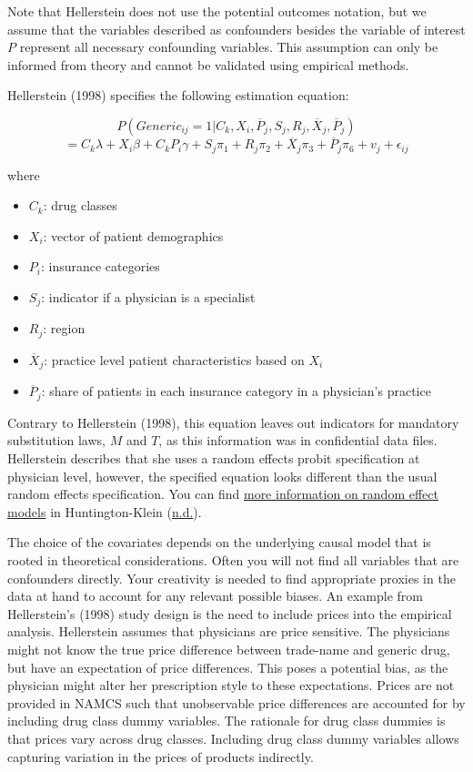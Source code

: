 \documentclass[
]{book}
\providecommand{\tightlist}{%
  \setlength{\itemsep}{0pt}\setlength{\parskip}{0pt}}
\begin{document}
Note that Hellerstein does not use the potential outcomes notation, but
we assume that the variables described as confounders besides the
variable of interest \(P\) represent all necessary confounding
variables. This assumption can only be informed from theory and cannot
be validated using empirical methods.

Hellerstein (1998) specifies the following estimation equation:

\[P(Generic_{ij}=1|C_k,X_i,\overline{P}_j,S_j, R_j,\overline{X}_j,\overline{P}_j)\]
\[= C_k\lambda+X_i\beta+C_kP_i\gamma+S_j\pi_1+R_j\pi_2+\overline{X}_j\pi_3+\overline{P}_j\pi_6+v_j+\epsilon_{ij}\]

where

\begin{itemize}
\tightlist
\item
  \(C_k\): drug classes
\item
  \(X_i\): vector of patient demographics
\item
  \(P_i\): insurance categories
\item
  \(S_j\): indicator if a physician is a specialist
\item
  \(R_j\): region
\item
  \(\overline{X}_j\): practice level patient characteristics based on
  \(X_i\)
\item
  \(\overline{P}_j\): share of patients in each insurance category in a
  physician's practice
\end{itemize}

Contrary to Hellerstein (1998), this equation leaves out indicators for
mandatory substitution laws, \(M\) and \(T\), as this information was in
confidential data files. Hellerstein describes that she uses a random
effects probit specification at physician level, however, the specified
equation looks different than the usual random effects specification.
You can find
\href{https://theeffectbook.net/ch-FixedEffects.html\#random-effects}{more
information on random effect models} in Huntington-Klein
(\protect\hyperlink{ref-huntington-klein_chapter_nodate}{n.d.}).

The choice of the covariates depends on the underlying causal model that
is rooted in theoretical considerations. Often you will not find all
variables that are confounders directly. Your creativity is needed to
find appropriate proxies in the data at hand to account for any relevant
possible biases. An example from Hellerstein's (1998) study design is
the need to include prices into the empirical analysis. Hellerstein
assumes that physicians are price sensitive. The physicians might not
know the true price difference between trade-name and generic drug, but
have an expectation of price differences. This poses a potential bias,
as the physician might alter her prescription style to these
expectations. Prices are not provided in NAMCS such that unobservable
price differences are accounted for by including drug class dummy
variables. The rationale for drug class dummies is that prices vary
across drug classes. Including drug class dummy variables allows
capturing variation in the prices of products indirectly.
\end{document}
